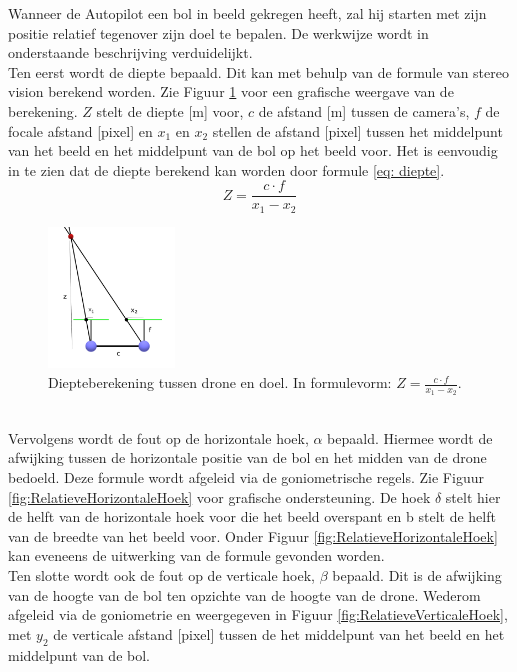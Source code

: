\noindent
Wanneer de Autopilot een bol in beeld gekregen heeft, zal hij starten met zijn positie relatief tegenover zijn doel te bepalen. De werkwijze wordt in onderstaande beschrijving verduidelijkt.
\\
Ten eerst wordt de diepte bepaald. Dit kan met behulp van de formule van stereo vision \cite{website:techbriefs} berekend worden.
Zie Figuur \ref{fig:DiepteberekeningDroneEnDoel} voor een grafische weergave van de berekening. \(Z\) stelt de diepte [m] voor, \(c\) de afstand [m] tussen de camera's, \(f\) de focale afstand [pixel] en $x_1$ en $x_2$ stellen de afstand [pixel] tussen het middelpunt van het beeld en het middelpunt van de bol op het beeld voor. Het is eenvoudig in te zien dat de diepte berekend kan worden door formule \ref{eq: diepte}.
\begin{equation} \label{eq: diepte}
Z = \frac{c \cdot f}{x_1 - x_2}
\end{equation}
\begin{figure}[h]
	\centering
	\includegraphics[width=0.3\textwidth]{DiepteberekeningDroneEnDoel.png}
	\caption{Diepteberekening tussen drone en doel. In formulevorm: \(Z = \frac{c \cdot f}{x_1 - x_2}\).}
	\label{fig:DiepteberekeningDroneEnDoel}
\end{figure}
\\
Vervolgens wordt de fout op de horizontale hoek, $\alpha$ bepaald. Hiermee wordt de afwijking tussen de horizontale positie van de bol en het midden van de drone bedoeld. Deze formule wordt afgeleid via de goniometrische regels. Zie Figuur \ref{fig:RelatieveHorizontaleHoek} voor grafische ondersteuning. De hoek $\delta$ stelt hier de helft van de horizontale hoek voor die het beeld overspant en b stelt de helft van de breedte van het beeld voor. Onder Figuur \ref{fig:RelatieveHorizontaleHoek} kan eveneens de uitwerking van de formule gevonden worden.
\\
Ten slotte wordt ook de fout op de verticale hoek, $\beta$ bepaald. Dit is de afwijking van de hoogte van de bol ten opzichte van de hoogte van de drone. Wederom afgeleid via de goniometrie en weergegeven in Figuur \ref{fig:RelatieveVerticaleHoek}, met $y_2$ de verticale afstand [pixel] tussen de het middelpunt van het beeld en het middelpunt van de bol.

